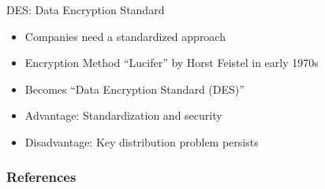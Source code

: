 \documentclass[]{beamer}
\begin{document}
\begin{frame}{DES: Data Encryption Standard}
	\begin{itemize}
		\item<1-> Companies need a standardized approach
		\item<2-> Encryption Method ``Lucifer'' by Horst Feistel in early 1970s
		\item<3-> Becomes ``Data Encryption Standard (DES)''
		\item<4-> Advantage: Standardization and security
		\item<5-> Disadvantage: Key distribution problem persists
	\end{itemize}
\end{frame}

\begin{frame}%
\frametitle{References}
	
	
\end{frame}
\end{document}
